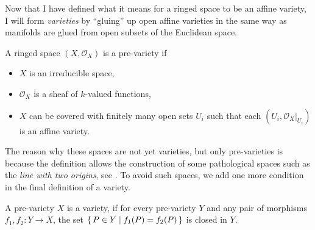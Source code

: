 Now that I have defined what it means for a ringed space to be an affine
variety, I will form \emph{varieties} by ``gluing'' up open affine varieties
in the same way as manifolds are glued from open subsets of the Euclidean
space.
\begin{defin}
  A ringed space $(X,\mathscr{O}_{X})$ is a pre-variety if
  \begin{itemize}
    \item $X$ is an irreducible space,
    \item $\mathscr{O}_{X}$ is a sheaf of $k$-valued functions,
    \item $X$ can be covered with finitely many open sets $U_{i}$
          such that each $(U_{i},\mathscr{O}_{X}\vert_{U_{i}})$ is
          an affine variety.
  \end{itemize}
\end{defin}
The reason why these spaces are not yet varieties, but only pre-varieties
is because the definition allows the construction of some pathological
spaces such as the \emph{line with two origins}, see \cite{gathmann}.
To avoid such spaces, we add one more condition in the final definition
of a variety.
\begin{defin}
  A pre-variety $X$ is a variety, if for every pre-variety $Y$ and any
  pair of morphisms $f_{1}, f_{2}: Y\to X$, the set
  $\set{P\in Y\mid f_{1}(P)=f_{2}(P)}$ is closed in $Y$.
\end{defin}

